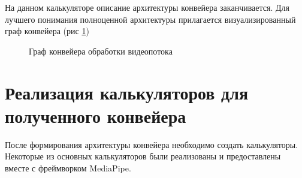 \documentclass[a4paper,14pt]{extreport}
\begin{document}
        На данном калькуляторе описание архитектуры конвейера заканчивается. Для лучшего понимания полноценной архитектуры прилагается визуализированный граф конвейера (рис \ref{ris:graph})
        \begin{figure}[h]
            \caption{Граф конвейера обработки видеопотока}
            \label{ris:graph}
        \end{figure}
        
        \section{Реализация калькуляторов для полученного конвейера}
        После формирования архитектуры конвейера необходимо создать калькуляторы. Некоторые из основных калькуляторов были реализованы и предоставлены вместе с фреймворком MediaPipe.
\end{document}
